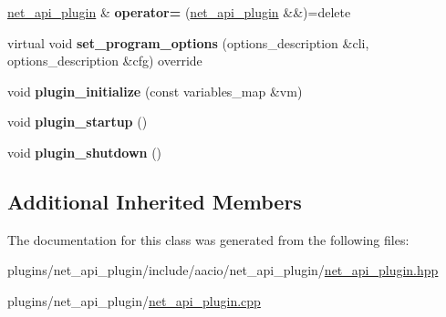 \begin{DoxyCompactItemize}
\mbox{\hyperlink{classaacio_1_1net__api__plugin}{net\+\_\+api\+\_\+plugin}} \& {\bfseries operator=} (\mbox{\hyperlink{classaacio_1_1net__api__plugin}{net\+\_\+api\+\_\+plugin}} \&\&)=delete
\item 
\mbox{\label{classaacio_1_1net__api__plugin_aa54b59668d4df02b1f94a8c530c30954}} 
virtual void {\bfseries set\+\_\+program\+\_\+options} (options\+\_\+description \&cli, options\+\_\+description \&cfg) override
\item 
\mbox{\label{classaacio_1_1net__api__plugin_aebe4c8eccf999bbf1e89e069fc2bbf61}} 
void {\bfseries plugin\+\_\+initialize} (const variables\+\_\+map \&vm)
\item 
\mbox{\label{classaacio_1_1net__api__plugin_aa4f09d120d6d9ea6dcf9f72a371b1e76}} 
void {\bfseries plugin\+\_\+startup} ()
\item 
\mbox{\label{classaacio_1_1net__api__plugin_a16fa407fb4547e59d8c5d843a9d9df1d}} 
void {\bfseries plugin\+\_\+shutdown} ()
\end{DoxyCompactItemize}
\subsection*{Additional Inherited Members}


The documentation for this class was generated from the following files\+:\begin{DoxyCompactItemize}
\item 
plugins/net\+\_\+api\+\_\+plugin/include/aacio/net\+\_\+api\+\_\+plugin/\mbox{\hyperlink{net__api__plugin_8hpp}{net\+\_\+api\+\_\+plugin.\+hpp}}\item 
plugins/net\+\_\+api\+\_\+plugin/\mbox{\hyperlink{net__api__plugin_8cpp}{net\+\_\+api\+\_\+plugin.\+cpp}}\end{DoxyCompactItemize}

